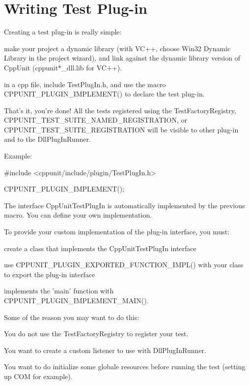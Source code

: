 \hypertarget{group___writing_test_plug_in}{
\section{Writing Test Plug-\/in}
\label{group___writing_test_plug_in}
}
Creating a test plug-\/in is really simple:
\begin{DoxyItemize}
\item make your project a dynamic library (with VC++, choose Win32 Dynamic Library in the project wizard), and link against the dynamic library version of CppUnit (cppunit$\ast$\_\-dll.lib for VC++).
\item in a cpp file, include TestPlugIn.h, and use the macro CPPUNIT\_\-PLUGIN\_\-IMPLEMENT() to declare the test plug-\/in.
\item That's it, you're done! All the tests registered using the TestFactoryRegistry, CPPUNIT\_\-TEST\_\-SUITE\_\-NAMED\_\-REGISTRATION, or CPPUNIT\_\-TEST\_\-SUITE\_\-REGISTRATION will be visible to other plug-\/in and to the DllPlugInRunner.
\end{DoxyItemize}

Example: 
\begin{DoxyCode}
 #include <cppunit/include/plugin/TestPlugIn.h>

 CPPUNIT_PLUGIN_IMPLEMENT();
\end{DoxyCode}


The interface CppUnitTestPlugIn is automatically implemented by the previous macro. You can define your own implementation.

To provide your custom implementation of the plug-\/in interface, you must:
\begin{DoxyItemize}
\item create a class that implements the CppUnitTestPlugIn interface
\item use CPPUNIT\_\-PLUGIN\_\-EXPORTED\_\-FUNCTION\_\-IMPL() with your class to export the plug-\/in interface
\item implements the 'main' function with CPPUNIT\_\-PLUGIN\_\-IMPLEMENT\_\-MAIN().
\end{DoxyItemize}

Some of the reason you may want to do this:
\begin{DoxyItemize}
\item You do not use the TestFactoryRegistry to register your test.
\item You want to create a custom listener to use with DllPlugInRunner.
\item You want to do initialize some globale resources before running the test (setting up COM for example).
\end{DoxyItemize}

